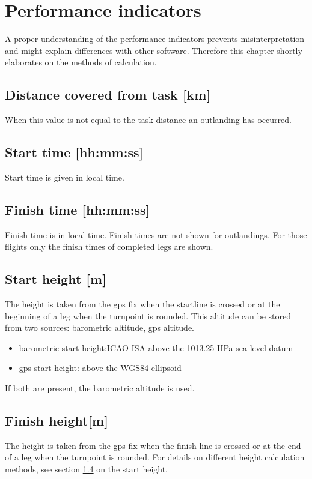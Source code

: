 \chapter{Performance indicators}
A proper understanding of the performance indicators prevents misinterpretation and might explain differences with other software. Therefore this chapter shortly elaborates on the methods of calculation.

\section{Distance covered from task [km]}
When this value is not equal to the task distance an outlanding has occurred.

\section{Start time [hh:mm:ss]}
Start time is given in local time.

\section{Finish time [hh:mm:ss]}
Finish time is in local time. Finish times are not shown for outlandings. For those flights only the finish times of completed legs are shown.

\section{Start height [m]}
\label{sec:start_height}
The height is taken from the gps fix when the startline is crossed or at the beginning of a leg when the turnpoint is rounded. This altitude can be stored from two sources: barometric altitude, gps altitude. 
\begin{itemize}
\item barometric start height:ICAO ISA above the 1013.25 HPa sea level datum
\item gps start height: above the WGS84 ellipsoid
\end{itemize}
If both are present, the barometric altitude is used.

\section{Finish height[m]}
The height is taken from the gps fix when the finish line is crossed or at the end of a leg when the turnpoint is rounded. For details on different height calculation methods, see section \ref{sec:start_height} on the start height.

